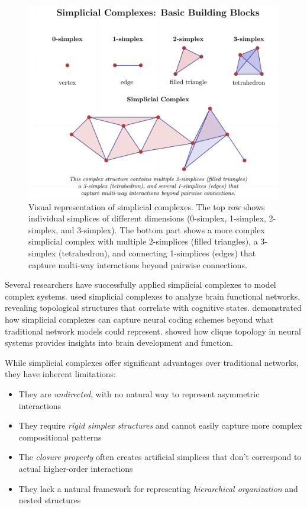 \begin{figure}[htbp]
    \centering
    \includegraphics[width=\textwidth]{figures/simplicial_complexes-1.png}
    \caption{Visual representation of simplicial complexes. The top row shows individual simplices of different dimensions (0-simplex, 1-simplex, 2-simplex, and 3-simplex). The bottom part shows a more complex simplicial complex with multiple 2-simplices (filled triangles), a 3-simplex (tetrahedron), and connecting 1-simplices (edges) that capture multi-way interactions beyond pairwise connections.}
    \label{fig:simplicial_complexes}
\end{figure}

Several researchers have successfully applied simplicial complexes to model complex systems. \citet{petri2014homological} used simplicial complexes to analyze brain functional networks, revealing topological structures that correlate with cognitive states. \citet{giusti2016two} demonstrated how simplicial complexes can capture neural coding schemes beyond what traditional network models could represent. \citet{sizemore2018importance} showed how clique topology in neural systems provides insights into brain development and function.

While simplicial complexes offer significant advantages over traditional networks, they have inherent limitations:
\begin{itemize}
    \item They are \textit{undirected}, with no natural way to represent asymmetric interactions
    \item They require \textit{rigid simplex structures} and cannot easily capture more complex compositional patterns
    \item The \textit{closure property} often creates artificial simplices that don't correspond to actual higher-order interactions
    \item They lack a natural framework for representing \textit{hierarchical organization} and nested structures
\end{itemize}

